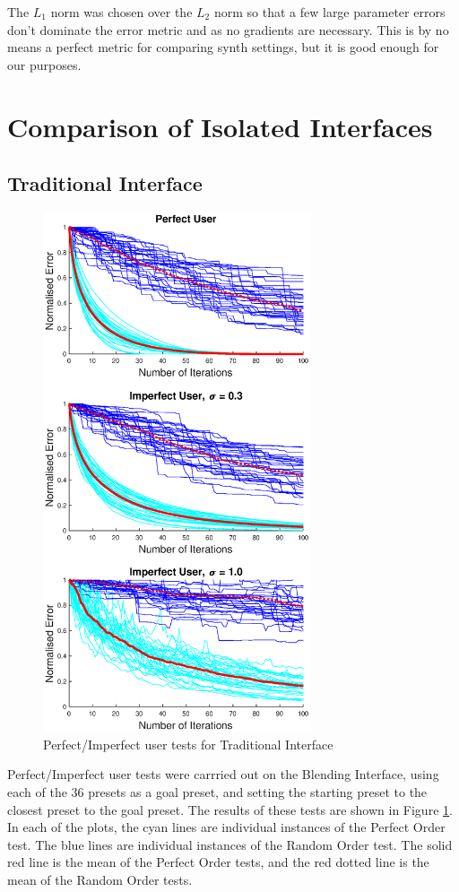 \documentclass[11pt, oneside]{report}   	%
\begin{document}
The $L_1$ norm was chosen over the $L_2$ norm so that a few large parameter errors don't dominate the error metric and as no gradients are necessary.
This is by no means a perfect metric for comparing synth settings, but it is good enough for our purposes.

\section{Comparison of Isolated Interfaces}
\subsection{Traditional Interface}\label{sec:TradEval}
\begin{figure}
	\centering
	\vspace{-110pt}
	\includegraphics[trim  ={0, 2.3cm, 0, 1.5cm}, clip, width = 3.1in]{TradInterfaceTests1.eps}
	\caption{Perfect/Imperfect user tests for Traditional Interface}
	\label{fig:TradTest1}
	
	
	\vspace{-40pt}
	
\end{figure}
Perfect/Imperfect user tests were carrried out on the Blending Interface, using each of the 36 presets as a goal preset, and setting the starting preset to the closest preset to the goal preset. The results of these tests are shown in Figure \ref{fig:TradTest1}. In each of the plots, the cyan lines are individual instances of the Perfect Order test. The blue lines are individual instances of the Random Order test. The solid red line is the mean of the Perfect Order tests, and the red dotted line is the mean of the Random Order tests. 
\end{document}
